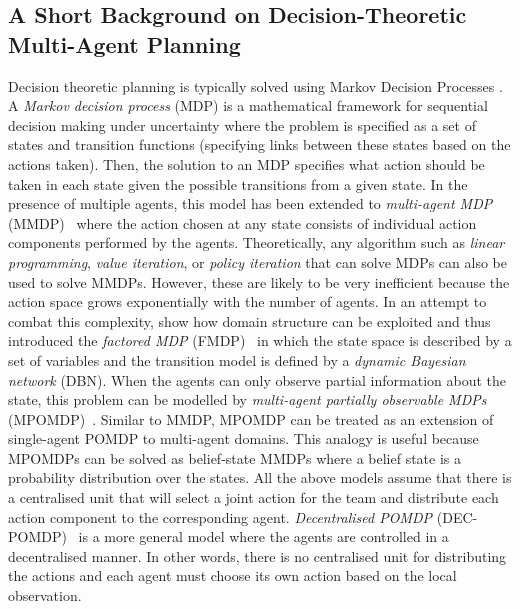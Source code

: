 \subsection{A Short Background on Decision-Theoretic Multi-Agent Planning}\label{sec:decisiontheoretic}
Decision theoretic planning is typically solved using Markov Decision Processes \cite{kolobov2012planning}. A {\em Markov decision process} (MDP) is a mathematical framework for sequential decision making under uncertainty where the problem is specified as a set of states and transition functions (specifying links between these states based on the actions taken). Then, the solution to an MDP specifies what action should be taken in each state given the possible transitions from a given state. In the presence of multiple agents, this model has been extended to {\em multi-agent MDP} (MMDP)~\cite{boutilier1996planning} where the action chosen at any state consists of individual action components performed by the agents. Theoretically, any algorithm such as {\em linear programming}, {\em value iteration}, or {\em policy iteration} that can solve MDPs can also be used to solve MMDPs. However, these are likely to be very inefficient because the action space grows exponentially with the number of agents. In an attempt to combat this complexity,  \cite{boutilier2000stochastic} show how  domain structure can be exploited and  thus introduced the {\em factored MDP} (FMDP)~  in which the state space is described by a set of variables and the transition model is defined by a {\em dynamic Bayesian network} (DBN). When the agents can only observe partial
information about the state, this problem can be modelled by {\em multi-agent partially observable MDPs} (MPOMDP)~\cite{pynadath2002communicative}. Similar to MMDP, MPOMDP can be treated as an extension of single-agent POMDP to multi-agent domains. This analogy is useful because MPOMDPs can be solved as belief-state MMDPs where a belief state is a probability distribution over the states. All the above models assume that there is a centralised unit that will select a joint action for the team and distribute each action component to the corresponding agent. {\em Decentralised POMDP} (DEC-POMDP)~\cite{bernstein2002complexity} is a more general model where the agents are controlled in a decentralised manner. In other words, there is no centralised unit for distributing the actions and each agent must choose its own action based on the local observation.

